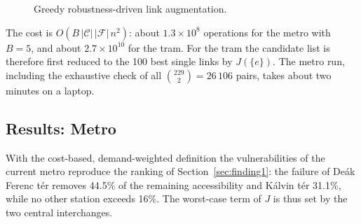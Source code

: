 \documentclass[12pt,a4paper]{article}
\theoremstyle{plain}
\theoremstyle{definition}
\theoremstyle{remark}
\begin{document}
\begin{figure}[H]
\centering
{}
\caption{Greedy robustness-driven link augmentation.}
\label{alg:augment}
\end{figure}

The cost is $O(B\,|\mathcal C|\,|\mathcal F|\,n^2)$: about
$1.3\times10^8$ operations for the metro with $B=5$, and about
$2.7\times10^{10}$ for the tram.  For the tram the candidate list is therefore
first reduced to the 100 best single links by $J(\{e\})$.  The metro run,
including the exhaustive check of all $\binom{229}{2}=26\,106$ pairs, takes
about two minutes on a laptop.

\subsection{Results: Metro}
\label{sec:aug-metro}

With the cost-based, demand-weighted definition the vulnerabilities of the
current metro reproduce the ranking of Section~\ref{sec:finding1}: the failure
of De\'ak Ferenc t\'er removes 44.5\% of the remaining accessibility and
K\'alvin t\'er 31.1\%, while no other station exceeds 16\%.  The worst-case
term of $J$ is thus set by the two central interchanges.
\end{document}
